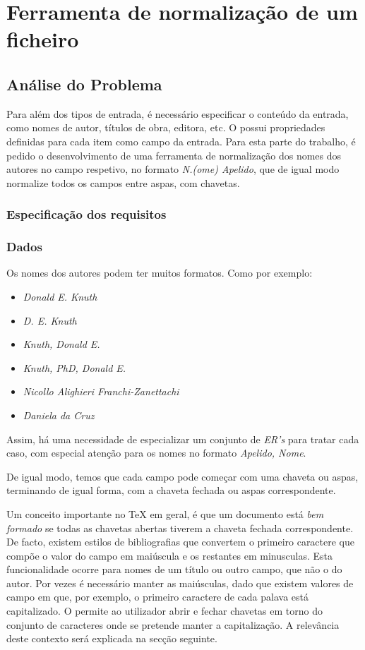 \chapter{Ferramenta de normalização de um ficheiro }
\label{chap:b1}



\section{Análise do Problema}
\label{sec:b1p:b1}
Para além dos tipos de entrada, é necessário especificar o conteúdo da entrada,
como nomes de autor, títulos de obra, editora, etc. O  possui
propriedades definidas para cada item como campo da entrada.  
Para esta parte do trabalho, é pedido o desenvolvimento de uma ferramenta de
normalização dos nomes dos autores no campo respetivo, no formato \emph{N.(ome)
Apelido}, que de igual modo normalize todos os campos entre aspas, com
chavetas. 

\subsection{Especificação dos requisitos}
\label{sec:spec:b1}

\subsection{Dados}
Os nomes dos autores podem ter muitos formatos. Como por exemplo:

\begin{itemize}
	\item \emph{Donald E. Knuth}
	\item \emph{D. E. Knuth}
	\item \emph{Knuth, Donald E.}
	\item \emph{Knuth, PhD, Donald E.}
	\item \emph{Nicollo Alighieri Franchi-Zanettachi}
	\item \emph{Daniela da Cruz}
\end{itemize}

Assim, há uma necessidade de especializar um conjunto de \emph{ER's} para tratar
cada caso, com especial atenção para os nomes no formato \emph{Apelido, Nome}.

De igual modo, temos que cada campo pode começar com uma chaveta ou aspas,
terminando de igual forma, com a chaveta fechada ou aspas correspondente.

Um conceito importante no \TeX{} em geral, é que um documento está \emph{bem
formado} se todas as chavetas abertas tiverem a chaveta fechada correspondente.
De facto, existem estilos de bibliografias que convertem o primeiro caractere
que compõe o valor do campo em maiúscula e os restantes em minusculas. Esta
funcionalidade ocorre para nomes de um título ou outro campo, que não o do
autor. Por vezes é necessário manter as maiúsculas, dado que existem valores de
campo em que, por exemplo, o primeiro caractere de cada palava está
capitalizado. O  permite ao utilizador abrir e fechar chavetas em
torno do conjunto de caracteres onde se pretende manter a capitalização.
A relevância deste contexto será explicada na secção seguinte.


